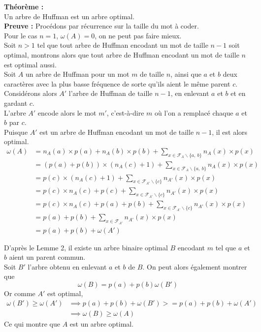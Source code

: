 \documentclass[a4paper, 12pt]{article}
\let\qed\square
\begin{document}
\newpage
\textbf{Théorème :} \\
Un arbre de Huffman est un arbre optimal. \\

\textbf{Preuve :}
Procédons par récurrence sur la taille du mot à coder. \\
Pour le cas $n = 1$, $\omega(A) = 0$, on ne peut pas faire mieux. \\
Soit $n > 1$ tel que tout arbre de Huffman encodant un mot de taille $n-1$ soit optimal, montrons alors que tout arbre de Huffman encodant un mot de taille $n$ est optimal aussi. \\
Soit $A$ un arbre de Huffman pour un mot $m$ de taille $n$, ainsi que $a$ et $b$ deux caractères avec la plus basse fréquence de sorte qu'ils aient le même parent $c$. \\
Considérons alors $A'$ l'arbre de Huffman de taille $n-1$, en enlevant $a$ et $b$ et en gardant $c$. \\
L'arbre $A'$ encode alors le mot $m'$, c'est-à-dire $m$ où l'on a remplacé chaque $a$ et $b$ par $c$. \\
Puisque $A'$ est un arbre de Huffman encodant un mot de taille $n-1$, il est alors optimal.
\begin{align*}
\omega(A) &= n_A(a)\times p(a) + n_A(b)\times p(b)+\sum_{x\in \mathcal{F}_A\backslash\{a,\ b\}} n_A(x)\times p(x)‎‎ \\
&= (p(a)+p(b))\times(n_A(c)+1)+\sum_{x\in \mathcal{F}_A\backslash\{a,\ b\}} n_A(x)\times p(x)‎‎ \\
&= p(c)\times(n_A(c)+1)+\sum_{x\in \mathcal{F}_{A'}\backslash\{c\}} n_{A'}(x)\times p(x)‎‎ \\
&= p(c)\times n_A(c)+p(c)+\sum_{x\in \mathcal{F}_{A'}\backslash\{c\}} n_{A'}(x)\times p(x)‎‎ \\
&= p(c)\times n_A(c)+p(a)+p(b)+\sum_{x\in \mathcal{F}_{A'}\backslash\{c\}} n_{A'}(x)\times p(x)‎‎ \\
&= p(a)+p(b)+\sum_{x\in \mathcal{F}_{A'}} n_{A'}(x)\times p(x)‎‎ \\
&= p(a)+p(b)+\omega(A')
\end{align*}

D'après le Lemme 2, il existe un arbre binaire optimal $B$ encodant $m$ tel que $a$ et $b$ aient un parent commun. \\ 
Soit $B'$ l'arbre obtenu en enlevant $a$ et $b$ de $B$. On peut alors également montrer que
$$
\omega(B) = p(a)+p(b)\omega(B')
$$
Or comme $A'$ est optimal,
\begin{align*}
\omega(B') \geq \omega(A') &\implies p(a)+p(b)+\omega(B') >= p(a)+p(b)+\omega(A') \\
&\implies \omega(B) \geq \omega(A)
\end{align*}
Ce qui montre que $A$ est un arbre optimal. \qed \\
\end{document}
